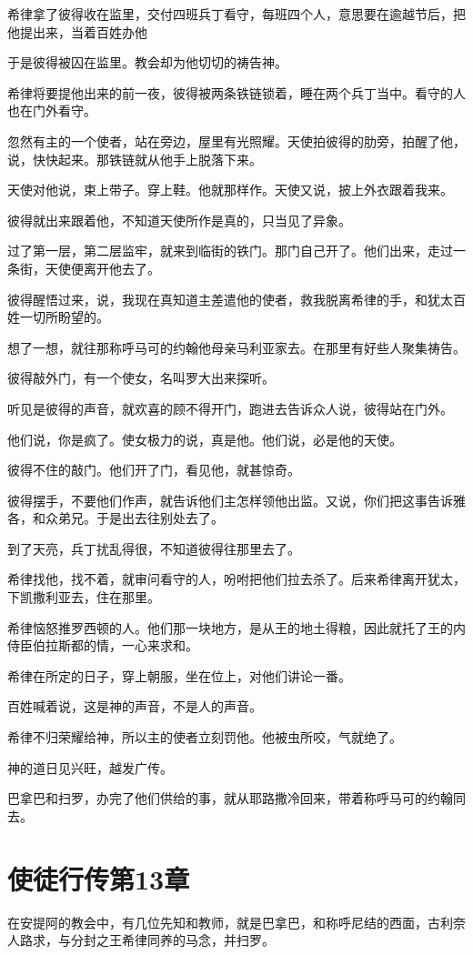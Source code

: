 \documentclass[12pt,oneside]{book}
\begin{document}
希律拿了彼得收在监里，交付四班兵丁看守，每班四个人，意思要在逾越节后，把他提出来，当着百姓办他

于是彼得被囚在监里。教会却为他切切的祷告神。

希律将要提他出来的前一夜，彼得被两条铁链锁着，睡在两个兵丁当中。看守的人也在门外看守。

忽然有主的一个使者，站在旁边，屋里有光照耀。天使拍彼得的肋旁，拍醒了他，说，快快起来。那铁链就从他手上脱落下来。

天使对他说，束上带子。穿上鞋。他就那样作。天使又说，披上外衣跟着我来。

彼得就出来跟着他，不知道天使所作是真的，只当见了异象。

过了第一层，第二层监牢，就来到临街的铁门。那门自己开了。他们出来，走过一条街，天使便离开他去了。

彼得醒悟过来，说，我现在真知道主差遣他的使者，救我脱离希律的手，和犹太百姓一切所盼望的。

想了一想，就往那称呼马可的约翰他母亲马利亚家去。在那里有好些人聚集祷告。

彼得敲外门，有一个使女，名叫罗大出来探听。

听见是彼得的声音，就欢喜的顾不得开门，跑进去告诉众人说，彼得站在门外。

他们说，你是疯了。使女极力的说，真是他。他们说，必是他的天使。

彼得不住的敲门。他们开了门，看见他，就甚惊奇。

彼得摆手，不要他们作声，就告诉他们主怎样领他出监。又说，你们把这事告诉雅各，和众弟兄。于是出去往别处去了。

到了天亮，兵丁扰乱得很，不知道彼得往那里去了。

希律找他，找不着，就审问看守的人，吩咐把他们拉去杀了。后来希律离开犹太，下凯撒利亚去，住在那里。

希律恼怒推罗西顿的人。他们那一块地方，是从王的地土得粮，因此就托了王的内侍臣伯拉斯都的情，一心来求和。

希律在所定的日子，穿上朝服，坐在位上，对他们讲论一番。

百姓喊着说，这是神的声音，不是人的声音。

希律不归荣耀给神，所以主的使者立刻罚他。他被虫所咬，气就绝了。

神的道日见兴旺，越发广传。

巴拿巴和扫罗，办完了他们供给的事，就从耶路撒冷回来，带着称呼马可的约翰同去。

\chapter{使徒行传第13章}
在安提阿的教会中，有几位先知和教师，就是巴拿巴，和称呼尼结的西面，古利奈人路求，与分封之王希律同养的马念，并扫罗。
\end{document}
